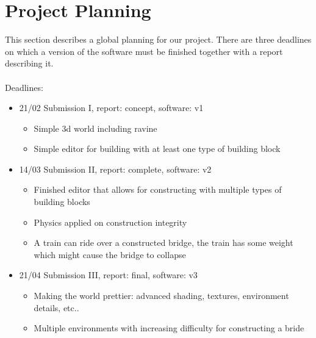 \section{Project Planning}
This section describes a global planning for our project. There are three deadlines on which a version of the software must be finished together with a report describing it.\\
\\
Deadlines:
\begin{itemize}
\item 21/02 Submission I, report: concept, software: v1 
\begin{itemize}
\item Simple 3d world including ravine
\item Simple editor for building with at least one type of building block
\end{itemize}

\item 14/03 Submission II, report: complete, software: v2 
\begin{itemize}
\item Finished editor that allows for constructing with multiple types of building blocks
\item Physics applied on construction integrity
\item A train can ride over a constructed bridge, the train has some weight which might cause the bridge to collapse
\end{itemize}

\item 21/04 Submission III, report: final, software: v3 
\begin{itemize}
\item Making the world prettier: advanced shading, textures, environment details, etc..
\item Multiple environments with increasing difficulty for constructing a bride
\end{itemize}
\end{itemize}